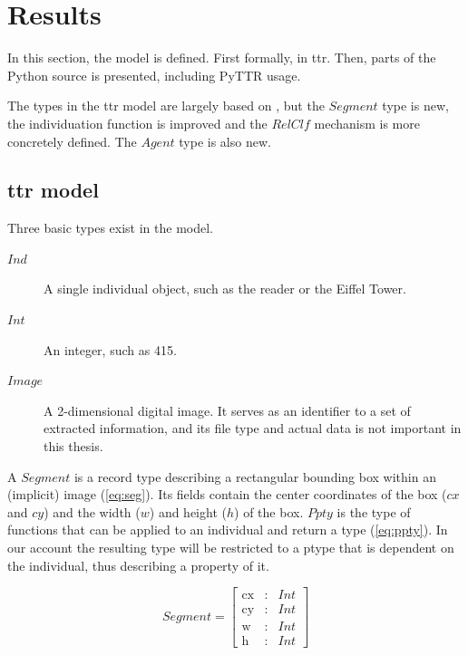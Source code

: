 \section{Results}
\label{sec:results}

In this section, the model is defined.
First formally, in \gls{ttr}.
Then, parts of the Python source is presented, including PyTTR usage.

The types in the \gls{ttr} model are largely based on \cite{lspc}, but the $Segment$ type is new, the individuation function is improved and the $RelClf$ mechanism is more concretely defined.
The $Agent$ type is also new.



\subsection{\Acrshort{ttr} model}
\label{ssec:ttrmodel}

Three basic types exist in the model.

\begin{description}
\item [$Ind$] A single individual object, such as the reader or the Eiffel Tower.
\item [$Int$] An integer, such as 415.
\item [$Image$] A 2-dimensional digital image. It serves as an identifier to a set of extracted information, and its file type and actual data is not important in this thesis.
\end{description}

A $Segment$ is a record type describing a rectangular bounding box within an (implicit) image (\autoref{eq:seg}).
Its fields contain the center coordinates of the box ($cx$ and $cy$) and the width ($w$) and height ($h$) of the box.
$Ppty$ is the type of functions that can be applied to an individual and return a type (\autoref{eq:ppty}).
In our account the resulting type will be restricted to a ptype that is dependent on the individual, thus describing a property of it.

\begin{equation}\label{eq:seg}
Segment = \left[\begin{array}{rcl}
\text{cx} &:& Int\\
\text{cy} &:& Int\\
\text{w} &:& Int\\
\text{h} &:& Int
\end{array}\right]\end{equation}

